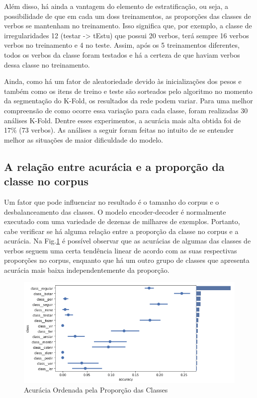 

Além disso, há ainda a vantagem do elemento de estratificação, ou seja, a possibilidade de que em cada um doss treinamentos, as proporções das classes de verbos se mantenham no treinamento. Isso significa que, por exemplo, a classe de irregularidades 12 (testar -> tEstu) que possui 20 verbos, terá sempre 16 verbos verbos no treinamento e 4 no teste. Assim, após os 5 treinamentos diferentes, todos os verbos da classe foram testados e há a certeza de que haviam verbos dessa classe no treinamento. 

Ainda, como há um fator de aleatoriedade devido às inicializações dos pesos e também como os itens de treino e teste são sorteados pelo algoritmo no momento da segmentação do K-Fold, os resultados da rede podem variar. Para uma melhor compreensão de como ocorre essa variação para cada classe, foram realizadas 30 análises K-Fold. Dentre esses experimentos, a acurácia mais alta obtida foi de 17\% (73 verbos). As análises a seguir foram feitas no intuito de se entender melhor as situações de maior dificuldade do modelo.

\subsection{A relação entre acurácia e a proporção da classe no corpus}
Um fator que pode influenciar no resultado é o tamanho do corpus e o desbalanceamento das classes. O modelo encoder-decoder é normalmente executado com uma variedade de dezenas de milhares de exemplos. Portanto, cabe verificar se há alguma relação entre a proporção da classe no corpus e a acurácia. Na Fig.\ref{fig:kfoldprop} é possível observar que as acurácias de algumas das classes de verbos seguem uma certa tendência linear de acordo com as suas respectivas proporções no corpus, enquanto que há um outro grupo de classes que apresenta acurácia mais baixa independentemente da proporção.

\begin{figure}[H]
  \centering
  \includegraphics[width=0.8\linewidth]{img/accuracy_kfold_1.png}
  \caption{Acurácia Ordenada pela Proporção das Classes}
  \label{fig:kfoldprop}
\end{figure}

